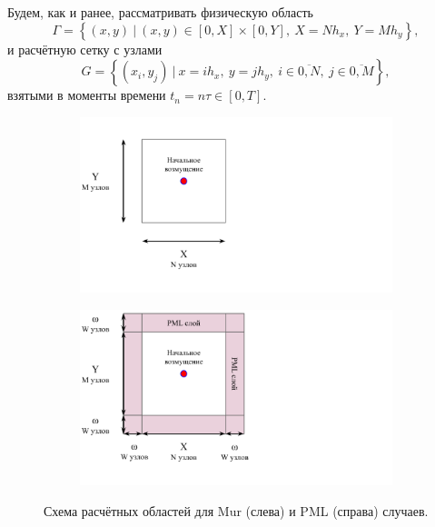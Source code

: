 Будем, как и ранее, рассматривать физическую область $$\Gamma = \left\{(x,y) ~|~ (x,y) \in [0,X]\times[0,Y],~ X=N h_x,~ Y=M h_y\right\},$$ и расчётную сетку с узлами $$G = \left\{(x_i,y_j) ~|~ x=ih_x, ~y=jh_y, ~i \in \overline{0,N},~ j \in \overline{0,M}\right\},$$ взятыми в моменты времени $t_n = n\tau \in [0,T]$.

\begin{figure}[H]
    \centering
    \begin{subfigure}{0.45\textwidth}
        \centering
        \includegraphics[trim={0px 70px 435px 0px},clip,width=1.0\textwidth]{images/pml/exp_mur_scheme.png}
    \end{subfigure}
    \hspace{0.025\textwidth}
    \begin{subfigure}{0.45\textwidth}
        \centering
        \includegraphics[trim={0px 70px 435px 0px},clip,width=1.0\textwidth]{images/pml/exp_pml_scheme.png}
    \end{subfigure}
    \caption{Схема расчётных областей для Mur (слева) и PML (справа) случаев.}
    \label{fig:experiment_scheme}
\end{figure}

